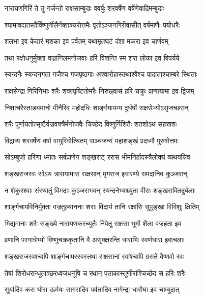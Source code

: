 
\twolineshloka
{नारायणगिरिं ते तु गर्जन्तो राक्षसाम्बुदाः}
{ववर्षुः शरवर्षेण वर्षेणेवाद्रिमम्बुदाः} %

\twolineshloka
{श्यामावदातस्तैर्विष्णुर्नीलैर्नक्तञ्चरोत्तमैः}
{वृतोऽञ्जनगिरीवासीत् वर्षमाणैः पयोधरैः} %

\twolineshloka
{शलभा इव केदारं मशका इव पर्वतम्}
{यथामृतघटं दंशा मकरा इव चार्णवम्} %

\twolineshloka
{तथा रक्षोधनुर्मुक्ता वज्रानिलमनोजवाः}
{हरिं विशन्ति स्म शरा लोका इव विपर्यये} %

\twolineshloka
{स्यन्दनैः स्यन्दनगता गजैश्च गजपृष्ठगाः}
{अश्वारोहास्तथाश्वैश्च पादाताश्चाम्बरे स्थिताः} %

\twolineshloka
{राक्षसेन्द्रा गिरिनिभाः शरैः शक्त्यृष्टितोमरैः}
{निरुछ्वासं हरिं चक्रुः प्राणायामा इव द्विजम्} %

\twolineshloka
{निशाचरैस्ताड्यमानो मीनैरिव महोदधिः}
{शार्ङ्गमायम्य दुर्धर्षो राक्षसेभ्योऽसृजच्छरान्} %

\twolineshloka
{शरैः पूर्णायतोत्सृष्टैर्वज्रवक्त्रैर्मनोजवैः}
{चिच्छेद विष्णुर्निशितैः शतशोऽथ सहस्रशः} %

\twolineshloka
{विद्राव्य शरवर्षेण वर्षा वायुरिवोत्थितम्}
{पाञ्चजन्यं महाशङ्खं प्रदध्मौ पुरुषोत्तमः} %

\twolineshloka
{सोऽम्बुजो हरिणा ध्मातः सर्वप्राणेन शङ्खराट्}
{ररास भीमनिर्हादस्त्रैलोक्यं व्यथयन्निव} %

\twolineshloka
{शङ्खराजरवः सोऽथ त्रासयामास राक्षसान्}
{मृगराज इवारण्ये समदानिव कुञ्जरान्} %

\twolineshloka
{न शेकुरश्वाः संस्थातुं विमदाः कुञ्जराभवन्}
{स्यन्दनेभ्यश्च्युता वीराः शङ्खरावितदुर्बलाः} %

\twolineshloka
{शार्ङ्गचापविनिर्मुक्ता वज्रतुल्याननाः शराः}
{विदार्य तानि रक्षांसि सुपुङ्खा विविशुः क्षितिम्} %

\twolineshloka
{भिद्यमानाः शरैः सङ्ख्ये नारायणकरच्युतैः}
{निपेतू राक्षसा भूमौ शैला वज्रहता इव} %

\twolineshloka
{व्रणानि परगात्रेभ्यो विष्णुचक्रकृतानि वै}
{असृक्क्षरन्ति धाराभिः स्वर्णधारा इवाचलाः} %

\twolineshloka
{शङ्खराजरवश्चापि शार्ङ्गचापरस्वस्तथा}
{राक्षसानां रवांश्चापि ग्रसते वैष्णवो रवः} %

\twolineshloka
{तेषां शिरोधरान्धूताञ्छरध्वजधनूंषि च}
{रथान् पताकास्तूणीरांश्चिच्छेद स हरिः शरैः} %

\twolineshloka
{सूर्यादिव करा घोरा ऊर्मयः सागरादिव}
{पर्वतादिव नागेन्द्रा धारौघा इव चाम्बुदात्} %

